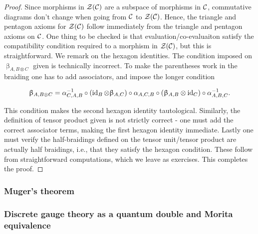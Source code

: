 \begin{proof} Since morphisms in ${\mathcal Z}({\mathcal C})$ are a subspace of morphisms in ${\mathcal C}$, commutative diagrams don't change when going from ${\mathcal C}$ to ${\mathcal Z}({\mathcal C})$. Hence, the triangle and pentagon axioms for ${\mathcal Z}({\mathcal C})$ follow immediately from the triangle and pentagon axioms on ${\mathcal C}$. One thing to be checked is that evaluation/co-evaluaiton satisfy the compatibility condition required to a morphism in ${\mathcal Z}({\mathcal C})$, but this is straightforward. We remark on the hexagon identities. The condition imposed on $\upbeta_{A,B\otimes C}$ given is technically incorrect. To make the parentheses work in the braiding one has to add associators, and impose the longer condition

$$\upbeta_{A,B\otimes C}=\alpha_{C,A,B}^{-1}\circ \left(\operatorname{id}_{B}\otimes \upbeta_{A,C}\right)\circ \alpha_{A,C,B}\circ\left(\upbeta_{A,B}\otimes \operatorname{id}_C\right)\circ \alpha^{-1}_{A,B,C}.$$

This condition makes the second hexagon identity tautological. Similarly, the definition of tensor product given is not strictly correct - one must add the correct associator terms, making the first hexagon identity immediate. Lastly one must verify the half-braidings defined on the tensor unit/tensor product are actually half braidings, i.e., that they satisfy the hexagon condition. These follow from straightforward computations, which we leave as exercises. This completes the proof.

\end{proof}

\subsubsection{Muger's theorem}


\subsubsection{Discrete gauge theory as a quantum double and Morita equivalence}

